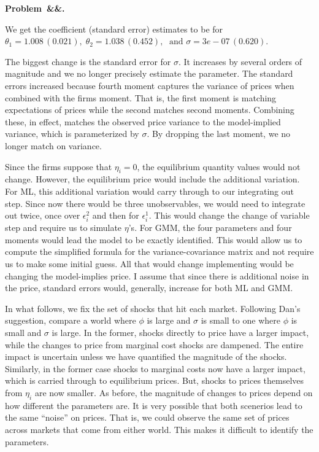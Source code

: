 \documentclass[12pt]{article}
\newcounter{problem}
\newenvironment{problem}[1][]{
    \newpage %
    \refstepcounter{problem}\par\noindent
    \textbf{Problem~\theproblem\ifx&#1&\else.~#1\fi}\rmfamily\par\vspace{0.5em}
}{\vspace{1em}}
\begin{document}
\begin{problem}
\begin{subproblems}
        \item We get the coefficient (standard error) estimates to be for $\theta_1 = 1.008 \,(0.021), \; \theta_2 = 1.038 \, (0.452), \; \text{ and } \sigma = 3e-07 \, (0.620)$.
        
        The biggest change is the standard error for $\sigma$. It increases by several orders of magnitude and we no longer precisely estimate the parameter. The standard errors increased because fourth moment captures the variance of prices when combined with the firms moment. That is, the first moment is matching expectations of prices while the second matches second moments. Combining these, in effect, matches the observed price variance to the model-implied variance, which is parameterized by $\sigma$. By dropping the last moment, we no longer match on variance. 


        \item Since the firms suppose that $\eta_i = 0$, the equilibrium quantity values would not change. However, the equilibrium price would include the additional variation. For ML, this additional variation would carry through to our integrating out step. Since now there would be three unobservables, we would need to integrate out twice, once over $\epsilon_i^2$ and then for $\epsilon_i^1$. This would change the change of variable step and require us to simulate $\eta$'s. For GMM, the four parameters and four moments would lead the model to be exactly identified. This would allow us to compute the simplified formula for the variance-covariance matrix and not require us to make some initial guess. All that would change implementing would be changing the model-implies price. I assume that since there is additional noise in the price, standard errors would, generally, increase for both ML and GMM. 
        
        \item In what follows, we fix the set of shocks that hit each market. Following Dan's suggestion, compare a world where $\phi$ is large and $\sigma$ is small to one where $\phi$ is small and $\sigma$ is large. In the former, shocks directly to price have a larger impact, while the changes to price from marginal cost shocks are dampened. The entire impact is uncertain unless we have quantified the magnitude of the shocks. Similarly, in the former case shocks to marginal costs now have a larger impact, which is carried through to equilibrium prices. But, shocks to prices themselves from $\eta_i$ are now smaller. As before, the magnitude of changes to prices depend on how different the parameters are. It is very possible that both scenerios lead to the same ``noise'' on prices. That is, we could observe the same set of prices across markets that come from either world. This makes it difficult to identify the parameters. 
        

\end{subproblems}
\end{problem}
\end{document}

